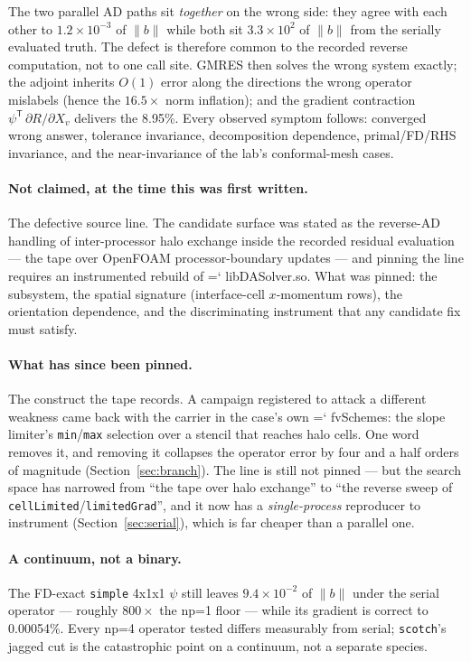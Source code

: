 \documentclass[11pt,a4paper]{article}
\newcommand{\artifact}[1]{{\small\ttfamily\hyphenchar\font=`\-\relax
  \def\_{\textunderscore\allowbreak}#1}}
\begin{document}
The two parallel AD paths sit \emph{together} on the wrong side: they agree with each other
to \(1.2\times10^{-3}\) of \(\lVert b\rVert\) while both sit \(3.3\times10^{2}\) of
\(\lVert b\rVert\) from the serially evaluated truth. The defect is therefore common to the
recorded reverse computation, not to one call site. GMRES then solves the wrong system
exactly; the adjoint inherits \(O(1)\) error along the directions the wrong operator
mislabels (hence the \(16.5\times\) norm inflation); and the gradient contraction
\(\psi^{\mathsf T}\,\partial R/\partial X_v\) delivers the 8.95\%. Every observed symptom
follows: converged wrong answer, tolerance invariance, decomposition dependence,
primal/FD/RHS invariance, and the near-invariance of the lab's conformal-mesh cases.

\paragraph{Not claimed, at the time this was first written.} The defective source line. The
candidate surface was stated as the reverse-AD handling of inter-processor halo exchange
inside the recorded residual evaluation --- the tape over OpenFOAM processor-boundary
updates --- and pinning the line requires an instrumented rebuild of
\artifact{libDASolver.so}. What was pinned: the subsystem, the spatial signature
(interface-cell \(x\)-momentum rows), the orientation dependence, and the discriminating
instrument that any candidate fix must satisfy.

\paragraph{What has since been pinned.} The construct the tape records. A campaign
registered to attack a different weakness came back with the carrier in the case's own
\artifact{fvSchemes}: the slope limiter's \texttt{min}/\texttt{max} selection over a stencil
that reaches halo cells. One word removes it, and removing it collapses the operator error
by four and a half orders of magnitude (Section~\ref{sec:branch}). The line is still not
pinned --- but the search space has narrowed from ``the tape over halo exchange'' to ``the
reverse sweep of \texttt{cellLimited}/\texttt{limitedGrad}'', and it now has a
\emph{single-process} reproducer to instrument (Section~\ref{sec:serial}), which is far
cheaper than a parallel one.

\paragraph{A continuum, not a binary.} The FD-exact \texttt{simple} 4x1x1 \(\psi\) still
leaves \(9.4\times10^{-2}\) of \(\lVert b\rVert\) under the serial operator --- roughly
\(800\times\) the np=1 floor --- while its gradient is correct to 0.00054\%. Every np=4
operator tested differs measurably from serial; \texttt{scotch}'s jagged cut is the
catastrophic point on a continuum, not a separate species.
\end{document}
